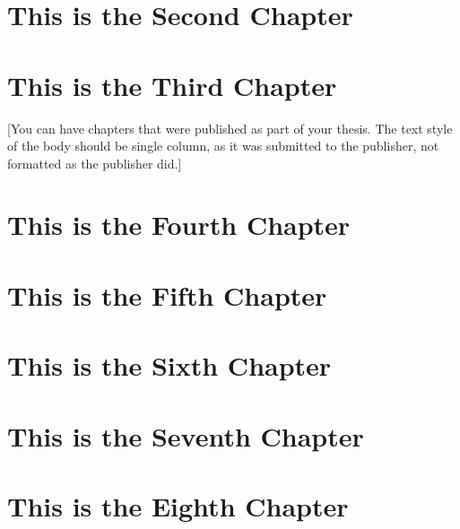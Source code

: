 \documentclass[12pt]{caltech_thesis}
\begin{document}
\chapter{This is the Second Chapter}



\chapter{This is the Third Chapter}


[You can have chapters that were published as part of your thesis. The text style of the body should be single column, as it was submitted to the publisher, not formatted as the publisher did.]

\chapter{This is the Fourth Chapter}
\chapter{This is the Fifth Chapter}
\chapter{This is the Sixth Chapter}
\chapter{This is the Seventh Chapter}
\chapter{This is the Eighth Chapter}

\printbibliography[heading=bibintoc]
%





\end{document}
